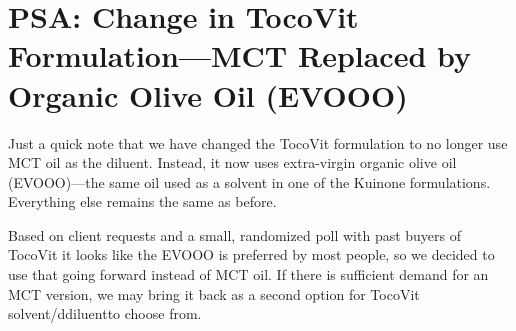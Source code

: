 \chapter{PSA: Change in TocoVit Formulation---MCT Replaced by Organic Olive Oil (EVOOO)}

\begin{refsection}

Just a quick note that we have changed the TocoVit formulation to no longer use MCT oil as the diluent. Instead, it now uses extra-virgin organic olive oil (EVOOO)---the same oil used as a solvent in one of the Kuinone formulations. Everything else remains the same as before. 

Based on client requests and a small, randomized poll with past buyers of TocoVit it looks like the EVOOO is preferred by most people, so we decided to use that going forward instead of MCT oil. If there is sufficient demand for an MCT version, we may bring it back as a second option for TocoVit solvent/ddiluentto choose from.

\printbibliography[heading=subbibliography]

\end{refsection}